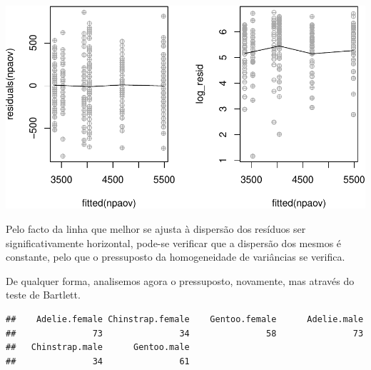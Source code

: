 \documentclass[]{article}
\begin{document}
\includegraphics{AEII_main_files/figure-latex/unnamed-chunk-10-1.pdf}

\begin{Shaded}
\begin{Highlighting}[]
\NormalTok{(} \NormalTok{(}\NormalTok{, }\NormalTok{))}
\end{Highlighting}
\end{Shaded}

Pelo facto da linha que melhor se ajusta à dispersão dos resíduos ser
significativamente horizontal, pode-se verificar que a dispersão dos
mesmos é constante, pelo que o pressuposto da homogeneidade de
variâncias se verifica.

De qualquer forma, analisemos agora o pressuposto, novamente, mas
através do teste de Bartlett.

\begin{Shaded}
\begin{Highlighting}[]
\SpecialCharTok{$}\OtherTok{\textless{}{-}} \SpecialCharTok{$}\SpecialCharTok{$}

\end{Highlighting}
\end{Shaded}

\begin{verbatim}
##    Adelie.female Chinstrap.female    Gentoo.female      Adelie.male 
##               73               34               58               73 
##   Chinstrap.male      Gentoo.male 
##               34               61
\end{verbatim}
\end{document}
